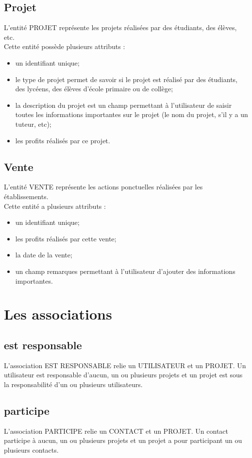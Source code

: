 \documentclass[asi, sansVersion]{picInsa}
\begin{document}
\subsection*{Projet}
L'entité PROJET représente les projets réalisées par des étudiants, des élèves, etc. \\
Cette entité possède plusieurs attributs : 
\begin{itemize}
\item un identifiant unique;
\item  le type de projet permet de savoir si le projet est réalisé par des étudiants, des lycéens, des élèves d'école primaire ou de collège; 
\item la description du projet est un champ permettant à l'utilisateur de saisir toutes les informations importantes sur le projet (le nom du projet, s'il y a un tuteur, etc);
\item les profits réalisés par ce projet.
\end{itemize}

\subsection*{Vente}
L'entité VENTE représente les actions ponctuelles réalisées par les établissements. \\ 
Cette entité a plusieurs attributs : 
\begin{itemize}
\item un identifiant unique; 
\item les profits réalisés par cette vente;
\item la date de la vente;
\item un champ remarques permettant à l'utilisateur d'ajouter des informations importantes. 
\end{itemize}
\section{Les associations}

\subsection*{est responsable}
L'association EST RESPONSABLE relie un UTILISATEUR et un PROJET. Un utilisateur est responsable d'aucun, un ou plusieurs projets et un projet est sous la responsabilité d'un ou plusieurs utilisateurs.

\subsection*{participe}
L'association PARTICIPE relie un CONTACT et un PROJET. Un contact participe à aucun, un ou plusieurs projets et un projet a pour participant un ou plusieurs contacts.
\end{document}
